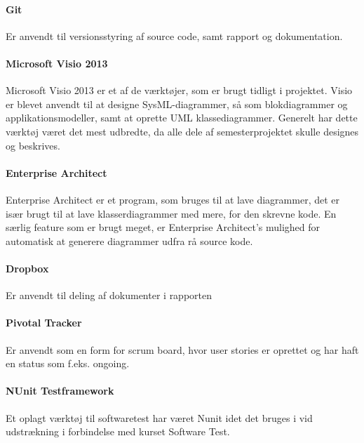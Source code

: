 \paragraph{Git}
Er anvendt til versionsstyring af source code, samt rapport og dokumentation.

\paragraph{Microsoft Visio 2013}
Microsoft Visio 2013 er et af de værktøjer, som er brugt tidligt i projektet. Visio er blevet anvendt til at designe SysML-diagrammer, så som blokdiagrammer og applikationsmodeller, samt at oprette UML klassediagrammer. Generelt har dette værktøj været det mest udbredte, da alle dele af semesterprojektet skulle designes og beskrives.

\paragraph{Enterprise Architect}
Enterprise Architect er et program, som bruges til at lave diagrammer, det er især brugt til at lave klasserdiagrammer med mere, for den skrevne kode. En særlig feature som er brugt meget, er Enterprise Architect's mulighed for automatisk at generere diagrammer udfra rå source kode.

\paragraph{Dropbox}
Er anvendt til deling af dokumenter i rapporten

\paragraph{Pivotal Tracker}
Er anvendt som en form for scrum board, hvor user stories er oprettet og har haft en status som f.eks. ongoing. 

\paragraph{NUnit Testframework}
Et oplagt værktøj til softwaretest har været Nunit idet det bruges i vid udstrækning i forbindelse med kurset Software Test.